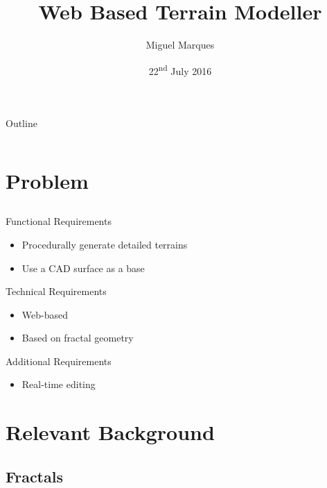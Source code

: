\documentclass[aspectratio=169]{beamer}
\author[Miguel Marques]{Miguel Marques}
\title{Web Based Terrain Modeller}
\date{22\textsuperscript{nd} July 2016}
\let\oldsection\section
\renewcommand{\section}[1]{
	\oldsection{#1}	
	\subsection{}
}
\newenvironment{myframe}[1][t]{\begin{frame}[#1]{\secname}{\subsecname}}{\end{frame}}
\begin{document}
	
	\begin{frame}
		\titlepage
	\end{frame}
	
	\begin{frame}[t]{Outline}
	{
		\renewcommand{\baselinestretch}{1.5}
		\begin{columns}[t]
			\begin{column}{\textwidth}
				\tableofcontents
			\end{column}
		\end{columns}	
	}
	\end{frame}
	
	\section{Problem}
	
	\begin{myframe}
		\vspace{-0.75cm}
		\begin{block}{Functional Requirements}
			\begin{itemize}
				\item Procedurally generate detailed terrains
				\item Use a CAD surface as a base
			\end{itemize}
		\end{block}
		\begin{block}{Technical Requirements}
			\begin{itemize}
				\item Web-based
				\item Based on fractal geometry
			\end{itemize}
		\end{block}
		\begin{block}{Additional Requirements}
			\begin{itemize}
				\item Real-time editing
			\end{itemize}
		\end{block}
	\end{myframe}
	
	\section{Relevant Background}
	
	\subsection{Fractals}
	
\end{document}
